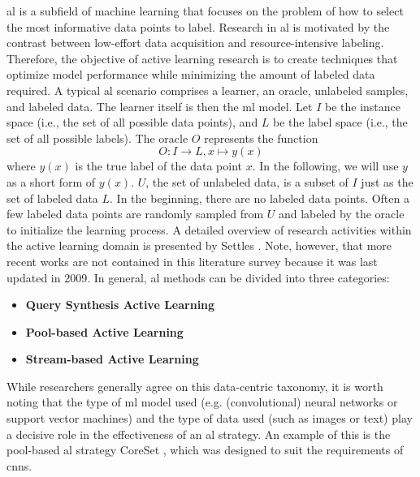 \gls{al} is a subfield of machine learning that focuses on the problem of how to select the most informative data points to label.
Research in \gls{al} is motivated by the contrast between low-effort data acquisition and resource-intensive labeling.
Therefore, the objective of active learning research is to create techniques that optimize model performance while minimizing the amount of
labeled data required. A typical \gls{al} scenario comprises a learner, an oracle, unlabeled samples, and labeled data. The learner
itself is then the \gls{ml} model. Let $I$ be the instance space (i.e., the set of all possible data points), and $L$ be the label
space (i.e., the set of all possible labels). The oracle $O$ represents the function
\begin{equation}
    O: I \rightarrow L, x \mapsto y(x)
\end{equation}
where $y(x)$ is the true label of the data point $x$. In the following, we will use $y$ as a short form of $y(x)$. $U$, the set of unlabeled data,
is a subset of $I$ just as the set of labeled data $L$. In the beginning, there are no labeled data points. Often a few labeled data points
are randomly sampled from $U$ and labeled by the oracle to initialize the learning process. A detailed overview of research activities within
the active learning domain is presented by Settles \cite{settles2009active}. Note, however, that more recent works are not contained in this
literature survey because it was last updated in 2009. In general, \gls{al} methods can be divided into three categories:
\begin{itemize}
    \item \textbf{Query Synthesis Active Learning}
    \item \textbf{Pool-based Active Learning}
    \item \textbf{Stream-based Active Learning}
\end{itemize}
While researchers generally agree on this data-centric taxonomy, it is worth noting that the type of \gls{ml} model used
(e.g. (convolutional) neural networks or support vector machines) and the type of data used (such as images or text) play a decisive role in the
effectiveness of an \gls{al} strategy. An example of this is the pool-based \gls{al} strategy CoreSet \cite{sener2017active}, which
was designed to suit the requirements of \glspl{cnn}.

